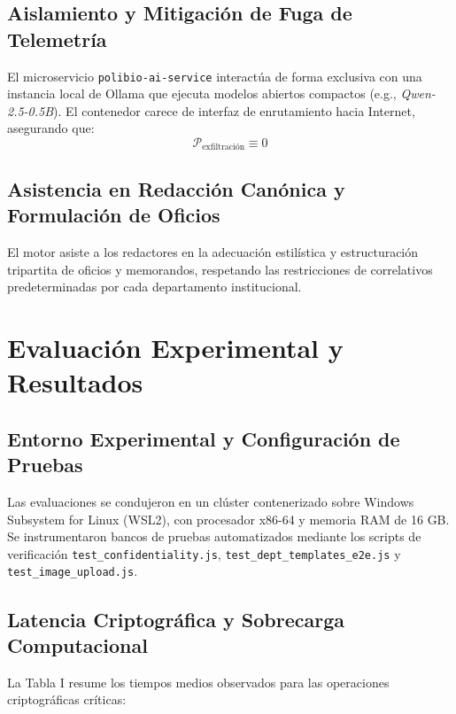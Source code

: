 \documentclass[journal,10pt]{IEEEtran}
\begin{document}
\subsection{Aislamiento y Mitigación de Fuga de Telemetría}
El microservicio \texttt{polibio-ai-service} interactúa de forma exclusiva con una instancia local de Ollama que ejecuta modelos abiertos compactos (e.g., \textit{Qwen-2.5-0.5B}). El contenedor carece de interfaz de enrutamiento hacia Internet, asegurando que:
\begin{equation}
\mathcal{P}_{\text{exfiltración}} \equiv 0
\end{equation}

\subsection{Asistencia en Redacción Canónica y Formulación de Oficios}
El motor asiste a los redactores en la adecuación estilística y estructuración tripartita de oficios y memorandos, respetando las restricciones de correlativos predeterminadas por cada departamento institucional.

\section{Evaluación Experimental y Resultados}
\subsection{Entorno Experimental y Configuración de Pruebas}
Las evaluaciones se condujeron en un clúster contenerizado sobre Windows Subsystem for Linux (WSL2), con procesador x86-64 y memoria RAM de 16 GB. Se instrumentaron bancos de pruebas automatizados mediante los scripts de verificación \texttt{test\_confidentiality.js}, \texttt{test\_dept\_templates\_e2e.js} y \texttt{test\_image\_upload.js}.

\subsection{Latencia Criptográfica y Sobrecarga Computacional}
La Tabla I resume los tiempos medios observados para las operaciones criptográficas críticas:
\end{document}
